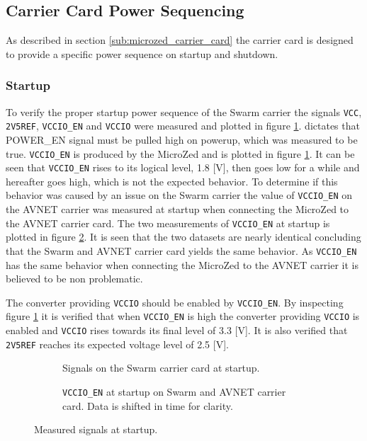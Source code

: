 \subsection{Carrier Card Power Sequencing}
As described in section \ref{sub:microzed_carrier_card} the carrier card is designed to provide a specific power sequence on startup and shutdown.

\subsubsection*{Startup}
To verify the proper startup power sequence of the Swarm carrier the signals \texttt{VCC}, \texttt{2V5REF}, \texttt{VCCIO\_EN} and \texttt{VCCIO} were measured and plotted in figure \ref{fig:startup_swarm}.
\cite{design_carrier} dictates that POWER\_EN signal must be pulled high on powerup, which was measured to be true.
\texttt{VCCIO\_EN} is produced by the MicroZed and is plotted in figure \ref{fig:startup_swarm}. 
It can be seen that \texttt{VCCIO\_EN} rises to its logical level, 1.8 [V], then goes low for a while and hereafter goes high, which is not the expected behavior.
To determine if this behavior was caused by an issue on the Swarm carrier the value of \texttt{VCCIO\_EN} on the AVNET carrier was measured at startup when connecting the MicroZed to the AVNET carrier card.
The two measurements of \texttt{VCCIO\_EN} at startup is plotted in figure \ref{fig:startup_vccioen}.
It is seen that the two datasets are nearly identical concluding that the Swarm and AVNET carrier card yields the same behavior.
As \texttt{VCCIO\_EN} has the same behavior when connecting the MicroZed to the AVNET carrier it is believed to be non problematic.

The converter providing \texttt{VCCIO} should be enabled by \texttt{VCCIO\_EN}.
By inspecting figure \ref{fig:startup_swarm} it is verified that when \texttt{VCCIO\_EN} is high the converter providing \texttt{VCCIO} is enabled and  \texttt{VCCIO} rises towards its final level of 3.3 [V].
It is also verified that \texttt{2V5REF} reaches its expected voltage level of 2.5 [V].

\begin{figure}[h]
\centering
\begin{subfigure}[t]{.45\textwidth}
  \centering
    
  \caption{Signals on the Swarm carrier card at startup.}
  \label{fig:startup_swarm}
\end{subfigure}%
\hfill
\begin{subfigure}[t]{.45\textwidth}
  \centering
  
  \caption{\texttt{VCCIO\_EN} at startup on Swarm and AVNET carrier card. Data is shifted in time for clarity.}
  \label{fig:startup_vccioen}
\end{subfigure}
\caption{Measured signals at startup.}
\label{fig:startup_plot}
\end{figure}

